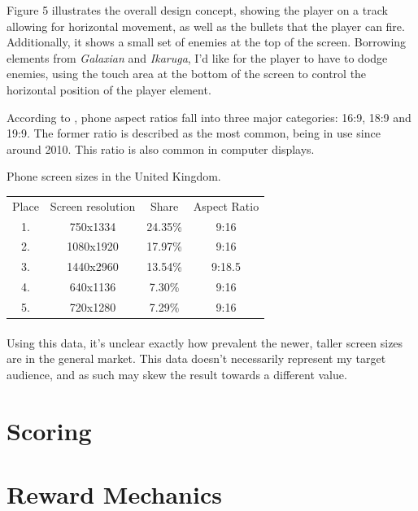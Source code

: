 \documentclass{scrartcl}
\let\cite\textcite
\let\citep\autocite
\begin{document}
Figure 5 illustrates the overall design concept, showing the player on a track allowing for horizontal movement, as well as the bullets that the player can fire. Additionally, it shows a small set of enemies at the top of the screen. Borrowing elements from \textit{Galaxian} and \textit{Ikaruga}, I'd like for the player to have to dodge enemies, using the touch area at the bottom of the screen to control the horizontal position of the player element.


According to \cite{Techlector001}, phone aspect ratios fall into three major categories: 16:9, 18:9 and 19:9. The former ratio is described as the most common, being in use since around 2010. This ratio is also common in computer displays.

Phone screen sizes in the United Kingdom. \citep{DeviceAtlas2019}

\begin{tabular}{ c c c c }

  Place & Screen resolution & Share   & Aspect Ratio \\

  1.    & 750x1334          & 24.35\% & 9:16         \\

  2.    & 1080x1920         & 17.97\% & 9:16         \\

  3.    & 1440x2960         & 13.54\% & 9:18.5       \\

  4.    & 640x1136          & 7.30\%  & 9:16         \\

  5.    & 720x1280          & 7.29\%  & 9:16         \\
\end{tabular}

\paragraph{}

Using this data, it's unclear exactly how prevalent the newer, taller screen sizes are in the general market. This data doesn't necessarily represent my target audience, and as such may skew the result towards a different value.

\section{Scoring}

\section{Reward Mechanics}

\printbibliography
\end{document}
